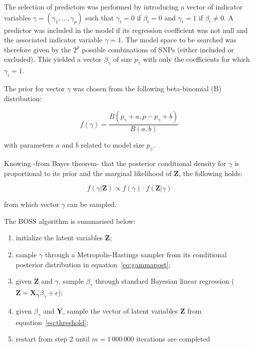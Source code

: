The selection of predictors was performed by introducing a vector of
indicator variables $\gamma=(\gamma_1, \ldots, \gamma_p)$ such that
$\gamma_i=0$ if $\beta_i=0$ and $\gamma_i=1$ if $\beta_i \neq 0$. A predictor
was included in the model if its regression coefficient was
not null and the associated indicator variable $\gamma=1$.
The model space to be searched was therefore given by the $2^p$ possible
combinations of SNPs (either included or excluded). This yielded a vector
$\beta_{\gamma}$ of size $p_{\gamma}$ with only the coefficients for which $\gamma_i=1$.

The prior for vector $\gamma$ was chosen from the following
beta-binomial (B) distribution: 

\begin{equation}
f(\gamma)=\frac{B(p_{\gamma}+a,p-p_{\gamma}+b)}{B(a,b)}
\label{eq:gammaprior}
\end{equation}


with parameters $a$ and $b$ related to model size $p_{\gamma}$.

Knowing -from Bayes theorem- that the posterior conditional density for $\gamma$ is
proportional to its prior and the marginal likelihood of $\mathbf{Z}$,
the following holds: 

\begin{equation}
f(\gamma|\mathbf{Z}) \propto f(\gamma) \cdot f(\mathbf{Z}|\gamma)
\label{eq:gammapost}
\end{equation}

from which vector $\gamma$ can be sampled.
 




The BOSS algorithm is summarised below:

\begin{enumerate}
\item initialize the latent variables $\mathbf{Z}$;
\item sample $\gamma$ through a Metropolis-Hastings sampler from its conditional posterior distribution
  in equation~\ref{eq:gammapost};
\item given $\mathbf{Z}$ and $\gamma$, sample $\beta_{\gamma}$ through
  standard Bayesian linear regression ($\mathbf{Z}=\mathbf{X_{\gamma}}\beta_{\gamma}+\epsilon$);
\item given $\beta_{\gamma}$ and $\mathbf{Y}$, sample the vector of latent
  variables $\mathbf{Z}$ from equation~\ref{eq:threshold};
\item restart from step 2 until $m=1\,000\,000$ iterations are completed
\end{enumerate}

